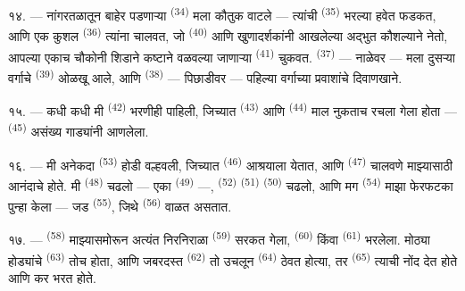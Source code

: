 \VUsaut{4.0mm}
\VUsaut{3.0mm}

१४. --- नांगरतळातून बाहेर पडणाऱ्या  \textsuperscript{(34)}
मला कौतुक वाटले — त्यांची  \textsuperscript{(35)} भरल्या हवेत फडकत, आणि एक कुशल
 \textsuperscript{(36)} त्यांना चालवत, जो 
\textsuperscript{(40)} आणि खुणादर्शकांनी आखलेल्या  अद्भुत कौशल्याने नेतो,
आपल्या एकाच चौकोनी शिडाने कष्टाने वळवल्या जाणाऱ्या 
\textsuperscript{(41)} चुकवत.  \textsuperscript{(37)} --- नाळेवर ---
मला दुसऱ्या वर्गाचे  \textsuperscript{(39)} ओळखू आले, आणि 
\textsuperscript{(38)} --- पिछाडीवर --- पहिल्या वर्गाच्या प्रवाशांचे दिवाणखाने.

१५. --- कधी कधी मी  \textsuperscript{(42)} भरणीही पाहिली, जिच्यात
 \textsuperscript{(43)} आणि  \textsuperscript{(44)}
माल नुकताच रचला गेला होता —  \textsuperscript{(45)} असंख्य
गाड्यांनी आणलेला.

\VUsaut{3.0mm}
\VUsaut{3.0mm}

१६. --- मी अनेकदा  \textsuperscript{(53)} होडी वल्हवली, जिच्यात
 \textsuperscript{(46)} आश्रयाला येतात, आणि 
\textsuperscript{(47)} चालवणे माझ्यासाठी आनंदाचे होते. मी 
\textsuperscript{(48)} चढलो — एका  \textsuperscript{(49)} —,
 \textsuperscript{(52)}  \textsuperscript{(51)}
 \textsuperscript{(50)} चढलो, आणि मग 
\textsuperscript{(54)} माझा फेरफटका पुन्हा केला — जड 
\textsuperscript{(55)}, जिथे  \textsuperscript{(56)} वाळत असतात.

१७. ---  \textsuperscript{(58)} माझ्यासमोरून अत्यंत निरनिराळा 
\textsuperscript{(59)} सरकत गेला,  \textsuperscript{(60)} किंवा
 \textsuperscript{(61)} भरलेला. मोठ्या होड्यांचे 
\textsuperscript{(63)} तोच होता, आणि जबरदस्त  \textsuperscript{(62)} तो उचलून
 \textsuperscript{(64)} ठेवत होत्या, तर 
 \textsuperscript{(65)} त्याची नोंद देत होते आणि कर भरत होते.

